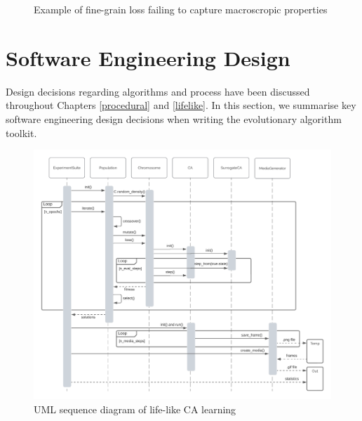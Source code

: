 \begin{figure}[!h]
\centering
            \hfill
            \hfill
            \hfill
            \hfill
            \hfill
            \caption{Example of fine-grain loss failing to capture macroscropic properties}
\label{fig:singleres-fail}
\end{figure}

\section{Software Engineering Design}

Design decisions regarding algorithms and process have been discussed throughout Chapters \ref{procedural} and \ref{lifelike}. In this section, we summarise key software engineering design decisions when writing the evolutionary algorithm toolkit.\\

\begin{figure}[!h]
\centering
    \includegraphics[width=\textwidth]{images/uml_seq.png}
    \caption{UML sequence diagram of life-like CA learning}
\label{fig:uml-seq}
\end{figure}


